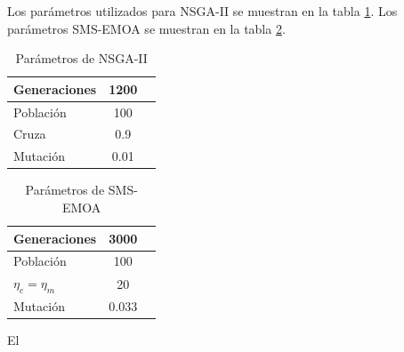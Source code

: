 Los par\'ametros utilizados para \DIFdelbegin {}\DIFdelend \DIFaddbegin {}\DIFaddend NSGA-II se muestran en la tabla \ref{tab:parametros2}. Los par\'ametros
\DIFdelbegin {}\DIFdelend \DIFaddbegin {}\DIFaddend SMS-EMOA se muestran en la tabla \ref{tab:parametros3}.

\begin{minipage}{0.5\textwidth}
\begin{table}[H]
  \begin{center}
    \begin{tabular}{|l||c|c}
	\hline
	Generaciones  & 1200 \\ 
	\hline
	Poblaci\'on & 100 \\ 
	\hline
	Cruza & 0.9 \\
	\hline
	Mutaci\'on & 0.01 \\
	\hline
  \end{tabular}
  \caption{Par\'ametros de NSGA-II}
  \label{tab:parametros2}
\end{center}
\end{table}
\end{minipage}
\begin{minipage}{0.5\textwidth}
\begin{table}[H]
	\begin{center}
		\begin{tabular}{|l||c|c}
			\hline
			Generaciones  & 3000 \\ 
			\hline
			Poblaci\'on & 100 \\ 
			\hline
			$\eta_c = \eta_m$ & 20 \\ 
			\hline
			Mutaci\'on & 0.033\\ 
			\hline			
		\end{tabular}
		\caption{Par\'ametros de SMS-EMOA}
		\label{tab:parametros3}
	\end{center}
\end{table}
\end{minipage}

El \DIFaddbegin {}

